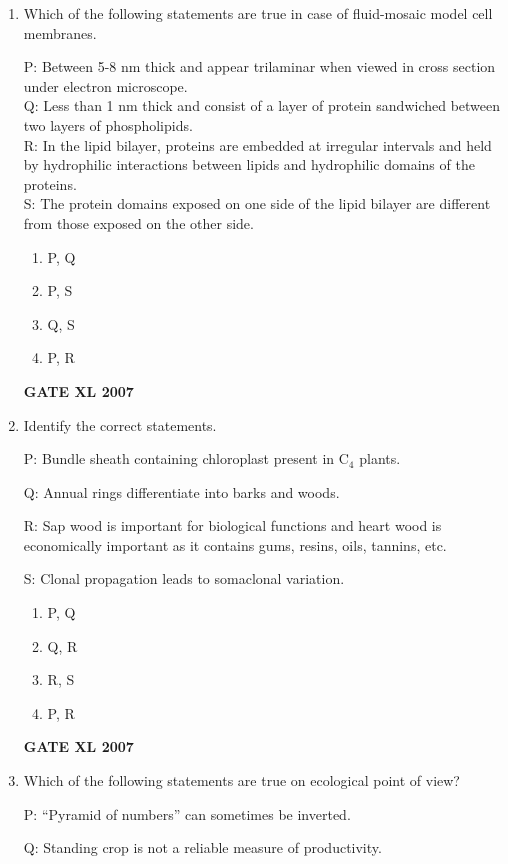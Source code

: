 \documentclass[journal,12pt,onecolumn]{IEEEtran}
\begin{document}
\begin{enumerate}
    \item Which of the following statements are true in case of fluid-mosaic model cell membranes.
    
    P: Between 5-8 nm thick and appear trilaminar when viewed in cross section under electron microscope. \\
    Q: Less than 1 nm thick and consist of a layer of protein sandwiched between two layers of phospholipids. \\
    R: In the lipid bilayer, proteins are embedded at irregular intervals and held by hydrophilic interactions between lipids and hydrophilic domains of the proteins. \\
    S: The protein domains exposed on one side of the lipid bilayer are different from those exposed on the other side.
    \begin{enumerate}
        \item P, Q
        \item P, S
        \item Q, S
        \item P, R
    \end{enumerate}\hfill{\textbf{GATE XL 2007}}

    \item Identify the correct statements.
    
    P: Bundle sheath containing chloroplast present in C$_4$ plants.

    Q: Annual rings differentiate into barks and woods.

    R: Sap wood is important for biological functions and heart wood is economically important as it contains gums, resins, oils, tannins, etc. 

    S: Clonal propagation leads to somaclonal variation.
    \begin{enumerate}
        \item P, Q
        \item Q, R
        \item R, S
        \item P, R
    \end{enumerate}\hfill{\textbf{GATE XL 2007}}

    \item Which of the following statements are true on ecological point of view?
    
    P: ``Pyramid of numbers'' can sometimes be inverted. 

    Q: Standing crop is not a reliable measure of productivity. 


\end{enumerate}
\end{document}
